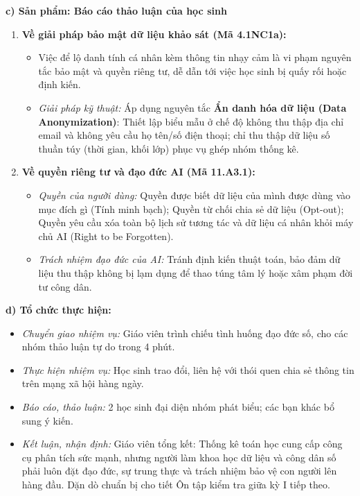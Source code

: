 \documentclass[12pt, a4paper]{article}
\begin{document}
\noindent \textbf{c) Sản phẩm: Báo cáo thảo luận của học sinh}
\begin{enumerate}[leftmargin=0.6cm]
    \item \textbf{Về giải pháp bảo mật dữ liệu khảo sát (Mã 4.1NC1a):}
    \begin{itemize}
        \item Việc để lộ danh tính cá nhân kèm thông tin nhạy cảm là vi phạm nguyên tắc bảo mật và quyền riêng tư, dễ dẫn tới việc học sinh bị quấy rối hoặc định kiến.
        \item \textit{Giải pháp kỹ thuật:} Áp dụng nguyên tắc \textbf{Ẩn danh hóa dữ liệu (Data Anonymization)}: Thiết lập biểu mẫu ở chế độ không thu thập địa chỉ email và không yêu cầu họ tên/số điện thoại; chỉ thu thập dữ liệu số thuần túy (thời gian, khối lớp) phục vụ ghép nhóm thống kê.
    \end{itemize}
    \item \textbf{Về quyền riêng tư và đạo đức AI (Mã 11.A3.1):}
    \begin{itemize}
        \item \textit{Quyền của người dùng:} Quyền được biết dữ liệu của mình được dùng vào mục đích gì (Tính minh bạch); Quyền từ chối chia sẻ dữ liệu (Opt-out); Quyền yêu cầu xóa toàn bộ lịch sử tương tác và dữ liệu cá nhân khỏi máy chủ AI (Right to be Forgotten).
        \item \textit{Trách nhiệm đạo đức của AI:} Tránh định kiến thuật toán, bảo đảm dữ liệu thu thập không bị lạm dụng để thao túng tâm lý hoặc xâm phạm đời tư công dân.
    \end{itemize}
\end{enumerate}

\noindent \textbf{d) Tổ chức thực hiện:}
\begin{itemize}[leftmargin=0.8cm]
    \item \textit{Chuyển giao nhiệm vụ:} Giáo viên trình chiếu tình huống đạo đức số, cho các nhóm thảo luận tự do trong 4 phút.
    \item \textit{Thực hiện nhiệm vụ:} Học sinh trao đổi, liên hệ với thói quen chia sẻ thông tin trên mạng xã hội hàng ngày.
    \item \textit{Báo cáo, thảo luận:} 2 học sinh đại diện nhóm phát biểu; các bạn khác bổ sung ý kiến.
    \item \textit{Kết luận, nhận định:} Giáo viên tổng kết: Thống kê toán học cung cấp công cụ phân tích sức mạnh, nhưng người làm khoa học dữ liệu và công dân số phải luôn đặt đạo đức, sự trung thực và trách nhiệm bảo vệ con người lên hàng đầu. Dặn dò chuẩn bị cho tiết Ôn tập kiểm tra giữa kỳ I tiếp theo.
\end{itemize}
\end{document}
